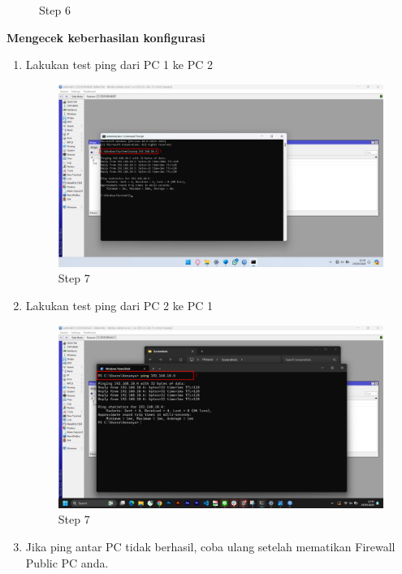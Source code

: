 \begin{center}
\begin{enumerate}
\begin{figure}[H]
			\caption{Step 6}
			\label{fig:Step 6(Per.3 PC2)}
		\end{figure}
	\end{enumerate}

	\textbf{Mengecek keberhasilan konfigurasi}
	\begin{enumerate}
		\item Lakukan test ping dari PC 1 ke PC 2
		\begin{figure}[H]
			\centering
			\includegraphics[width=0.9\linewidth]{P1/img/per3/pc1/Step 7.png}
			\caption{Step 7}
			\label{fig:Step 7(Per.3 PC1)}
		\end{figure}
		\item Lakukan test ping dari PC 2 ke PC 1
		\begin{figure}[H]
			\centering
			\includegraphics[width=0.9\linewidth]{P1/img/per3/pc2/Step 7.png}
			\caption{Step 7}
			\label{fig:Step 7(Per.3 PC2)}
		\end{figure}
		\item Jika ping antar PC tidak berhasil, coba ulang setelah mematikan Firewall Public PC anda.
	\end{enumerate}
\end{center}

